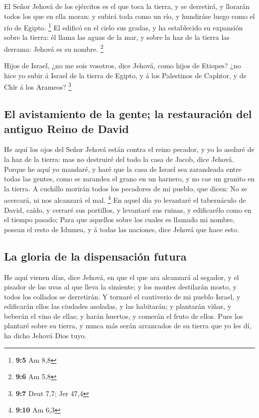  El Señor Jehová de los ejércitos es el que toca la tierra,
y se derretirá, y llorarán todos los que en ella moran: y subirá toda
como un río, y hundiráse luego como el río de Egipto. \footnote{\textbf{9:5}
  Am 8,8}  El edificó en el cielo sus gradas, y ha
establecido su expansión sobre la tierra: él llama las aguas de la mar,
y sobre la haz de la tierra las derrama: Jehová es su nombre.
\footnote{\textbf{9:6} Am 5,8}

 Hijos de Israel, ¿no me sois vosotros, dice Jehová, como
hijos de Etiopes? ¿no hice yo subir á Israel de la tierra de Egipto, y á
los Palestinos de Caphtor, y de Chîr á los Arameos? \footnote{\textbf{9:7}
  Deut 7,7; Jer 47,4}

\hypertarget{el-avistamiento-de-la-gente-la-restauraciuxf3n-del-antiguo-reino-de-david}{%
\subsection{El avistamiento de la gente; la restauración del antiguo
Reino de
David}\label{el-avistamiento-de-la-gente-la-restauraciuxf3n-del-antiguo-reino-de-david}}

 He aquí los ojos del Señor Jehová están contra el reino
pecador, y yo lo asolaré de la haz de la tierra: mas no destruiré del
todo la casa de Jacob, dice Jehová.  Porque he aquí yo
mandaré, y haré que la casa de Israel sea zarandeada entre todas las
gentes, como se zarandea el grano en un harnero, y no cae un granito en
la tierra.  A cuchillo morirán todos los pecadores de mi
pueblo, que dicen: No se acercará, ni nos alcanzará el mal. \footnote{\textbf{9:10}
  Am 6,3}  En aquel día yo levantaré el tabernáculo de
David, caído, y cerraré sus portillos, y levantaré sus ruinas, y
edificarélo como en el tiempo pasado;  Para que aquellos
sobre los cuales es llamado mi nombre, posean el resto de Idumea, y á
todas las naciones, dice Jehová que hace esto.

\hypertarget{la-gloria-de-la-dispensaciuxf3n-futura}{%
\subsection{La gloria de la dispensación
futura}\label{la-gloria-de-la-dispensaciuxf3n-futura}}

 He aquí vienen días, dice Jehová, en que el que ara
alcanzará al segador, y el pisador de las uvas al que lleva la simiente;
y los montes destilarán mosto, y todos los collados se derretirán.
 Y tornaré el cautiverio de mi pueblo Israel, y edificarán
ellos las ciudades asoladas, y las habitarán; y plantarán viñas, y
beberán el vino de ellas; y harán huertos, y comerán el fruto de ellos.
 Pues los plantaré sobre su tierra, y nunca más serán
arrancados de su tierra que yo les dí, ha dicho Jehová Dios tuyo.
